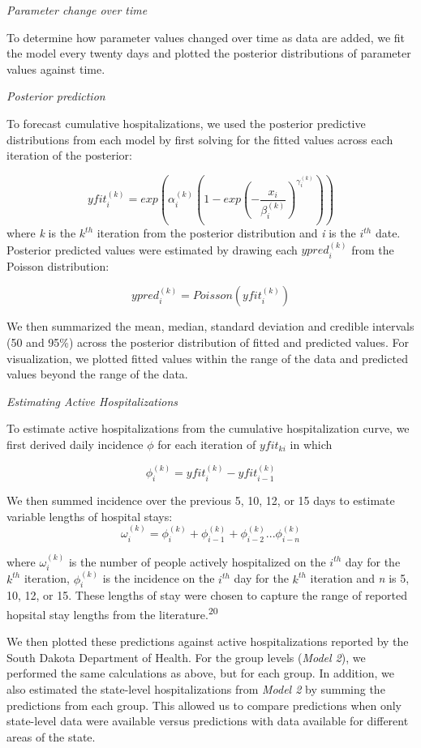 \documentclass[
]{article}
\begin{document}
\emph{Parameter change over time}

To determine how parameter values changed over time as data are added, we fit the model every twenty days and plotted the posterior distributions of parameter values against time.

\emph{Posterior prediction}

To forecast cumulative hospitalizations, we used the posterior predictive distributions from each model by first solving for the fitted values across each iteration of the posterior:

\[yfit_i^{(k)} = exp(\alpha_i^{(k)}(1 - exp(-\frac{x_i}{\beta_i^{(k)}})^{\gamma_i^{(k)}}))\]
where \emph{k} is the \(k^{th}\) iteration from the posterior distribution and \emph{i} is the \(i^{th}\) date. Posterior predicted values were estimated by drawing each \(ypred_i^{(k)}\) from the Poisson distribution:

\[ypred_i^{(k)} = Poisson(yfit_i^{(k)})\]

We then summarized the mean, median, standard deviation and credible intervals (50 and 95\%) across the posterior distribution of fitted and predicted values. For visualization, we plotted fitted values within the range of the data and predicted values beyond the range of the data.

\emph{Estimating Active Hospitalizations}

To estimate active hospitalizations from the cumulative hospitalization curve, we first derived daily incidence \(\phi\) for each iteration of \(yfit_{ki}\) in which

\[\phi_{i}^{(k)} = yfit_i^{(k)} - yfit_{i-1}^{(k)}\]

We then summed incidence over the previous 5, 10, 12, or 15 days to estimate variable lengths of hospital stays:
\[\omega_i^{(k)} = \phi_i^{(k)} + \phi_{i-1}^{(k)} + \phi_{i-2}^{(k)}...\phi_{i-n}^{(k)}\]

where \(\omega_i^{(k)}\) is the number of people actively hospitalized on the \(i^{th}\) day for the \(k^{th}\) iteration, \(\phi_i^{(k)}\) is the incidence on the \(i^{th}\) day for the \(k^{th}\) iteration and \emph{n} is 5, 10, 12, or 15. These lengths of stay were chosen to capture the range of reported hopsital stay lengths from the literature.\textsuperscript{20}

We then plotted these predictions against active hospitalizations reported by the South Dakota Department of Health. For the group levels (\emph{Model 2}), we performed the same calculations as above, but for each group. In addition, we also estimated the state-level hospitalizations from \emph{Model 2} by summing the predictions from each group. This allowed us to compare predictions when only state-level data were available versus predictions with data available for different areas of the state.
\end{document}

